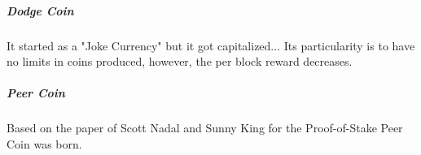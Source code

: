 \subparagraph{Dodge Coin \cite{MaxK.2013DogecoinCore}}
It started as a "Joke Currency" but it got capitalized... Its particularity is to have no limits in coins produced, however, the per block reward decreases. 

\subparagraph{Peer Coin \cite{King2012Peercoin}}
Based on the paper of Scott Nadal and Sunny King \cite{King2012PPCoin:Proof-of-Stake} for the Proof-of-Stake Peer Coin was born.

